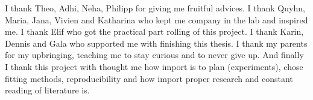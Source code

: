 I thank Theo, Adhi, Neha, Philipp for giving me fruitful advices.
I thank Quyhn, Maria, Jana, Vivien and Katharina who kept me company in the lab and inspired me. 
I thank Elif who got the practical part rolling of this project. 
I thank Karin, Dennis and Gala who supported me with finishing this thesis. 
I thank my parents for my upbringing, teaching me to stay curious and to never give up.
And finally I thank this project with thought me how import is to plan (experiments), chose fitting methods, reproducibility and how import proper research and constant reading of literature is. 
